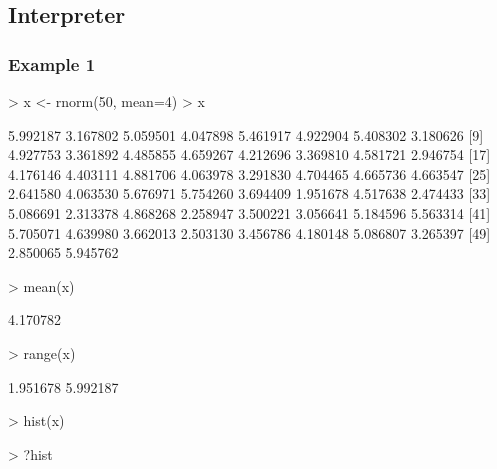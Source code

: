 \documentclass[10pt,letterpaper]{article}
\newenvironment{Schunk}{}{}
\begin{document}
\subsection{Interpreter}

\subsubsection{Example 1} %
\label{ssub:example_1}

\begin{Schunk}
\begin{Sinput}
> x <- rnorm(50, mean=4)
> x
\end{Sinput}
\begin{Soutput}
 [1] 5.992187 3.167802 5.059501 4.047898 5.461917 4.922904 5.408302 3.180626
 [9] 4.927753 3.361892 4.485855 4.659267 4.212696 3.369810 4.581721 2.946754
[17] 4.176146 4.403111 4.881706 4.063978 3.291830 4.704465 4.665736 4.663547
[25] 2.641580 4.063530 5.676971 5.754260 3.694409 1.951678 4.517638 2.474433
[33] 5.086691 2.313378 4.868268 2.258947 3.500221 3.056641 5.184596 5.563314
[41] 5.705071 4.639980 3.662013 2.503130 3.456786 4.180148 5.086807 3.265397
[49] 2.850065 5.945762
\end{Soutput}
\begin{Sinput}
> mean(x)
\end{Sinput}
\begin{Soutput}
[1] 4.170782
\end{Soutput}
\begin{Sinput}
> range(x)
\end{Sinput}
\begin{Soutput}
[1] 1.951678 5.992187
\end{Soutput}
\begin{Sinput}
> hist(x)
\end{Sinput}
\end{Schunk}
\begin{Schunk}
\begin{Sinput}
> ?hist
\end{Sinput}
\end{Schunk}
\end{document}
